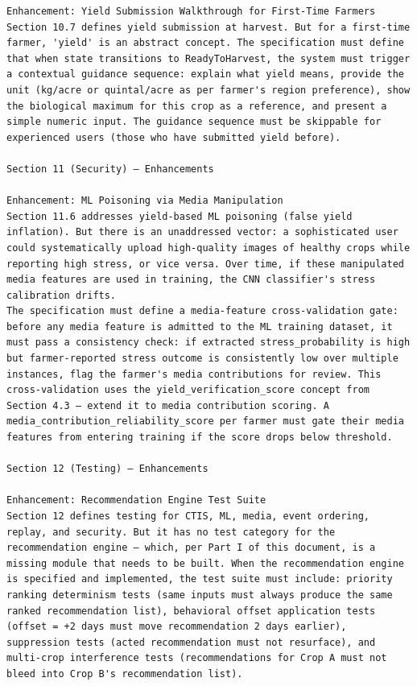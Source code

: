 \documentclass{article}
\begin{document}
\begin{verbatim}
Enhancement: Yield Submission Walkthrough for First-Time Farmers
Section 10.7 defines yield submission at harvest. But for a first-time farmer, 'yield' is an abstract concept. The specification must define that when state transitions to ReadyToHarvest, the system must trigger a contextual guidance sequence: explain what yield means, provide the unit (kg/acre or quintal/acre as per farmer's region preference), show the biological maximum for this crop as a reference, and present a simple numeric input. The guidance sequence must be skippable for experienced users (those who have submitted yield before).

Section 11 (Security) — Enhancements

Enhancement: ML Poisoning via Media Manipulation
Section 11.6 addresses yield-based ML poisoning (false yield inflation). But there is an unaddressed vector: a sophisticated user could systematically upload high-quality images of healthy crops while reporting high stress, or vice versa. Over time, if these manipulated media features are used in training, the CNN classifier's stress calibration drifts.
The specification must define a media-feature cross-validation gate: before any media feature is admitted to the ML training dataset, it must pass a consistency check: if extracted stress_probability is high but farmer-reported stress outcome is consistently low over multiple instances, flag the farmer's media contributions for review. This cross-validation uses the yield_verification_score concept from Section 4.3 — extend it to media contribution scoring. A media_contribution_reliability_score per farmer must gate their media features from entering training if the score drops below threshold.

Section 12 (Testing) — Enhancements

Enhancement: Recommendation Engine Test Suite
Section 12 defines testing for CTIS, ML, media, event ordering, replay, and security. But it has no test category for the recommendation engine — which, per Part I of this document, is a missing module that needs to be built. When the recommendation engine is specified and implemented, the test suite must include: priority ranking determinism tests (same inputs must always produce the same ranked recommendation list), behavioral offset application tests (offset = +2 days must move recommendation 2 days earlier), suppression tests (acted recommendation must not resurface), and multi-crop interference tests (recommendations for Crop A must not bleed into Crop B's recommendation list).


\end{verbatim}
\end{document}
